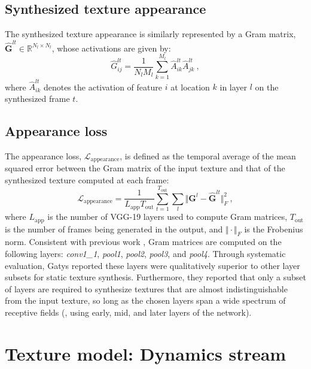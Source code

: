 \subsection{Synthesized texture appearance}

The synthesized texture appearance is similarly represented by a
Gram matrix, $\hat{\mathbf{G}}^{lt} \in \mathbb{R}^{N_l \times N_l}$,
whose activations are given by:
\begin{equation}
	\hat{G}_{ij}^{lt} = \frac{1}{N_l M_l} \sum_{k=1}^{M_l} \hat{A}_{ik}^{lt} \hat{A}_{jk}^{lt}\ ,
	\label{eq:gram_synthesized}	
\end{equation}
where $\hat{A}_{ik}^{lt}$ denotes the activation of feature $i$ at
location $k$ in layer $l$ on the synthesized frame $t$.

\subsection{Appearance loss}

The appearance loss, $\mathcal{L}_\text{appearance}$, is defined as the temporal average of the mean squared error between
the Gram matrix of the input texture and that of the synthesized
texture computed at each frame:
\begin{equation}
   \mathcal{L}_\text{appearance} = \frac{1}{L_\text{app} T_\text{out}} \sum_{t=1}^{T_\text{out}} \sum_{l} \Vert \mathbf{G}^l - \hat{\mathbf{G}}^{lt} \Vert^2_F\ ,
   \label{eq:apploss}
\end{equation}
where $L_\text{app}$ is the number of VGG-19 layers used to compute Gram
matrices, $T_\text{out}$ is the number of frames being generated in
the output, and $\Vert \cdot \Vert_F$ is the Frobenius norm.
Consistent with previous work \cite{gatys2015}, Gram matrices are computed on the
following layers: 
\emph{conv1\_1}, \emph{pool1}, \emph{pool2}, \emph{pool3}, and \emph{pool4}. Through systematic evaluation, Gatys \etal \cite{gatys2015} reported these layers were qualitatively superior to other layer subsets for static texture synthesis. Furthermore, they reported that only a subset of layers are required to synthesize textures that are almost indistinguishable from the input texture, so long as the chosen layers span a wide spectrum of receptive fields (\ie, using early, mid, and later layers of the network).

\section{Texture model: Dynamics stream}


